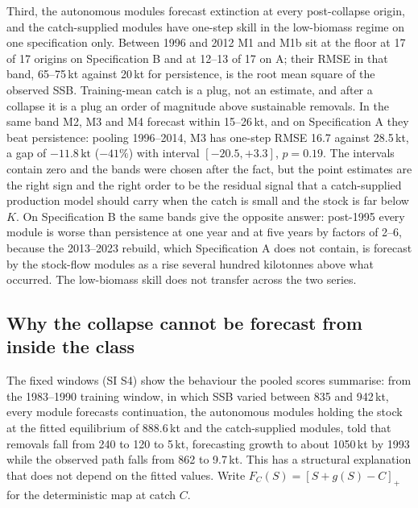 \documentclass[preprint,11pt,authoryear]{elsarticle}
\theoremstyle{definition}
\theoremstyle{remark}
\newcommand{\kt}{\,\mathrm{kt}}
\newcommand{\Spos}[1]{\left[#1\right]_{+}}
\begin{document}
Third, the autonomous modules forecast extinction at every post-collapse origin, and the catch-supplied modules have one-step skill in the low-biomass regime on one specification only. Between 1996 and 2012 M1 and M1b sit at the floor at 17 of 17 origins on Specification B and at 12--13 of 17 on A; their RMSE in that band, 65--75\,kt against 20\,kt for persistence, is the root mean square of the observed SSB. Training-mean catch is a plug, not an estimate, and after a collapse it is a plug an order of magnitude above sustainable removals. In the same band M2, M3 and M4 forecast within 15--26\,kt, and on Specification A they beat persistence: pooling 1996--2014, M3 has one-step RMSE 16.7 against 28.5\,kt, a gap of $-11.8\kt$ ($-41\%$) with interval $[-20.5,+3.3]$, $p=0.19$. The intervals contain zero and the bands were chosen after the fact, but the point estimates are the right sign and the right order to be the residual signal that a catch-supplied production model should carry when the catch is small and the stock is far below $K$. On Specification B the same bands give the opposite answer: post-1995 every module is worse than persistence at one year and at five years by factors of 2--6, because the 2013--2023 rebuild, which Specification A does not contain, is forecast by the stock-flow modules as a rise several hundred kilotonnes above what occurred. The low-biomass skill does not transfer across the two series.

\FloatBarrier
\subsection{Why the collapse cannot be forecast from inside the class}\label{sec:identification}

The fixed windows (SI S4) show the behaviour the pooled scores summarise: from the 1983--1990 training window, in which SSB varied between 835 and 942\,kt, every module forecasts continuation, the autonomous modules holding the stock at the fitted equilibrium of 888.6\,kt and the catch-supplied modules, told that removals fall from 240 to 120 to 5\,kt, forecasting growth to about 1050\,kt by 1993 while the observed path falls from 862 to 9.7\,kt. This has a structural explanation that does not depend on the fitted values. Write $F_C(S) = \Spos{S + g(S) - C}$ for the deterministic map at catch $C$.
\end{document}
